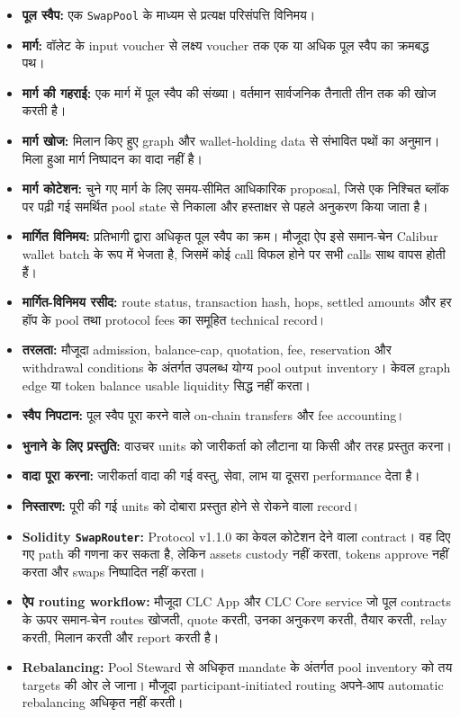 \documentclass[11pt]{article}
\begin{document}
\begin{itemize}[leftmargin=*]
\item \textbf{पूल स्वैप:} एक \texttt{SwapPool} के माध्यम से प्रत्यक्ष परिसंपत्ति विनिमय।
\item \textbf{मार्ग:} वॉलेट के input voucher से लक्ष्य voucher तक एक या अधिक पूल स्वैप का क्रमबद्ध पथ।
\item \textbf{मार्ग की गहराई:} एक मार्ग में पूल स्वैप की संख्या। वर्तमान सार्वजनिक तैनाती तीन तक की खोज करती है।
\item \textbf{मार्ग खोज:} मिलान किए हुए graph और wallet-holding data से संभावित पथों का अनुमान। मिला हुआ मार्ग निष्पादन का वादा नहीं है।
\item \textbf{मार्ग कोटेशन:} चुने गए मार्ग के लिए समय-सीमित आधिकारिक proposal, जिसे एक निश्चित ब्लॉक पर पढ़ी गई समर्थित pool state से निकाला और हस्ताक्षर से पहले अनुकरण किया जाता है।
\item \textbf{मार्गित विनिमय:} प्रतिभागी द्वारा अधिकृत पूल स्वैप का क्रम। मौजूदा ऐप इसे समान-चेन Calibur wallet batch के रूप में भेजता है, जिसमें कोई call विफल होने पर सभी calls साथ वापस होती हैं।
\item \textbf{मार्गित-विनिमय रसीद:} route status, transaction hash, hops, settled amounts और हर हॉप के pool तथा protocol fees का समूहित technical record।
\item \textbf{तरलता:} मौजूदा admission, balance-cap, quotation, fee, reservation और withdrawal conditions के अंतर्गत उपलब्ध योग्य pool output inventory। केवल graph edge या token balance usable liquidity सिद्ध नहीं करता।
\item \textbf{स्वैप निपटान:} पूल स्वैप पूरा करने वाले on-chain transfers और fee accounting।
\item \textbf{भुनाने के लिए प्रस्तुति:} वाउचर units को जारीकर्ता को लौटाना या किसी और तरह प्रस्तुत करना।
\item \textbf{वादा पूरा करना:} जारीकर्ता वादा की गई वस्तु, सेवा, लाभ या दूसरा performance देता है।
\item \textbf{निस्तारण:} पूरी की गई units को दोबारा प्रस्तुत होने से रोकने वाला record।
\item \textbf{Solidity \texttt{SwapRouter}:} Protocol v1.1.0 का केवल कोटेशन देने वाला contract। वह दिए गए path की गणना कर सकता है, लेकिन assets custody नहीं करता, tokens approve नहीं करता और swaps निष्पादित नहीं करता।
\item \textbf{ऐप routing workflow:} मौजूदा CLC App और CLC Core service जो पूल contracts के ऊपर समान-चेन routes खोजती, quote करती, उनका अनुकरण करती, तैयार करती, relay करती, मिलान करती और report करती है।
\item \textbf{Rebalancing:} Pool Steward से अधिकृत mandate के अंतर्गत pool inventory को तय targets की ओर ले जाना। मौजूदा participant-initiated routing अपने-आप automatic rebalancing अधिकृत नहीं करती।

\end{itemize}
\end{document}
